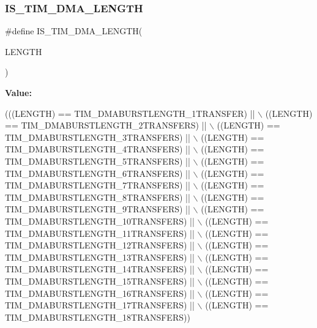 \subsubsection{\texorpdfstring{I\+S\+\_\+\+T\+I\+M\+\_\+\+D\+M\+A\+\_\+\+L\+E\+N\+G\+TH}{IS\_TIM\_DMA\_LENGTH}}
{\footnotesize\ttfamily \#define I\+S\+\_\+\+T\+I\+M\+\_\+\+D\+M\+A\+\_\+\+L\+E\+N\+G\+TH(\begin{DoxyParamCaption}\item[{}]{L\+E\+N\+G\+TH }\end{DoxyParamCaption})}

{\bfseries Value\+:}
\begin{DoxyCode}
(((LENGTH) == TIM\_DMABURSTLENGTH\_1TRANSFER) || \(\backslash\)
                                   ((LENGTH) == TIM\_DMABURSTLENGTH\_2TRANSFERS) || \(\backslash\)
                                   ((LENGTH) == TIM\_DMABURSTLENGTH\_3TRANSFERS) || \(\backslash\)
                                   ((LENGTH) == TIM\_DMABURSTLENGTH\_4TRANSFERS) || \(\backslash\)
                                   ((LENGTH) == TIM\_DMABURSTLENGTH\_5TRANSFERS) || \(\backslash\)
                                   ((LENGTH) == TIM\_DMABURSTLENGTH\_6TRANSFERS) || \(\backslash\)
                                   ((LENGTH) == TIM\_DMABURSTLENGTH\_7TRANSFERS) || \(\backslash\)
                                   ((LENGTH) == TIM\_DMABURSTLENGTH\_8TRANSFERS) || \(\backslash\)
                                   ((LENGTH) == TIM\_DMABURSTLENGTH\_9TRANSFERS) || \(\backslash\)
                                   ((LENGTH) == TIM\_DMABURSTLENGTH\_10TRANSFERS) || \(\backslash\)
                                   ((LENGTH) == TIM\_DMABURSTLENGTH\_11TRANSFERS) || \(\backslash\)
                                   ((LENGTH) == TIM\_DMABURSTLENGTH\_12TRANSFERS) || \(\backslash\)
                                   ((LENGTH) == TIM\_DMABURSTLENGTH\_13TRANSFERS) || \(\backslash\)
                                   ((LENGTH) == TIM\_DMABURSTLENGTH\_14TRANSFERS) || \(\backslash\)
                                   ((LENGTH) == TIM\_DMABURSTLENGTH\_15TRANSFERS) || \(\backslash\)
                                   ((LENGTH) == TIM\_DMABURSTLENGTH\_16TRANSFERS) || \(\backslash\)
                                   ((LENGTH) == TIM\_DMABURSTLENGTH\_17TRANSFERS) || \(\backslash\)
                                   ((LENGTH) == TIM\_DMABURSTLENGTH\_18TRANSFERS))
\end{DoxyCode}
\mbox{\label{group___t_i_m___i_s___t_i_m___definitions_ga9dd5baa6b2a44e0f25068a650cbfdd1b}} 

